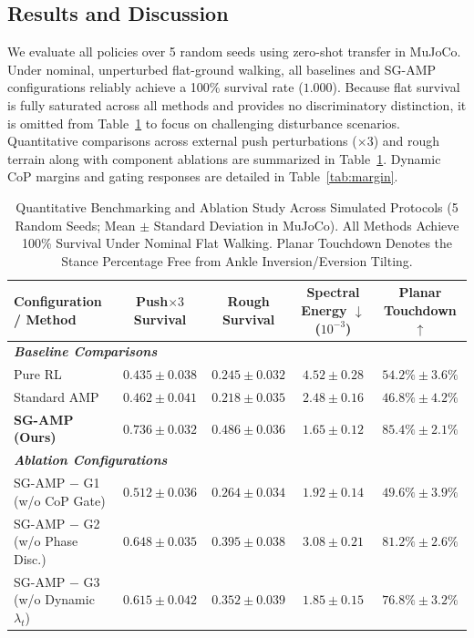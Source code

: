 \documentclass[conference]{IEEEtran}
\begin{document}
\subsection{Results and Discussion}
\label{subsec:results}

We evaluate all policies over 5 random seeds using zero-shot transfer in MuJoCo. Under nominal, unperturbed flat-ground walking, all baselines and SG-AMP configurations reliably achieve a 100\% survival rate ($1.000$). Because flat survival is fully saturated across all methods and provides no discriminatory distinction, it is omitted from Table~\ref{tab:comparison} to focus on challenging disturbance scenarios. Quantitative comparisons across external push perturbations ($\times 3$) and rough terrain along with component ablations are summarized in Table~\ref{tab:comparison}. Dynamic CoP margins and gating responses are detailed in Table~\ref{tab:margin}.

\begin{table}[t]
  \centering
  \caption{Quantitative Benchmarking and Ablation Study Across Simulated Protocols (5 Random Seeds; Mean $\pm$ Standard Deviation in MuJoCo). All Methods Achieve 100\% Survival Under Nominal Flat Walking. Planar Touchdown Denotes the Stance Percentage Free from Ankle Inversion/Eversion Tilting.}
  \label{tab:comparison}
  \small
  \begin{tabular}{lcccc}
    \toprule
    Configuration / Method & Push$\times3$ Survival & Rough Survival & Spectral Energy $\downarrow$ ($10^{-3}$) & Planar Touchdown $\uparrow$ \\
    \midrule
    \multicolumn{5}{l}{\textit{\textbf{Baseline Comparisons}}} \\
    Pure RL & $0.435 \pm 0.038$ & $0.245 \pm 0.032$ & $4.52 \pm 0.28$ & $54.2\% \pm 3.6\%$ \\
    Standard AMP & $0.462 \pm 0.041$ & $0.218 \pm 0.035$ & $2.48 \pm 0.16$ & $46.8\% \pm 4.2\%$ \\
    \textbf{SG-AMP (Ours)} & $\mathbf{0.736 \pm 0.032}$ & $\mathbf{0.486 \pm 0.036}$ & $\mathbf{1.65 \pm 0.12}$ & $\mathbf{85.4\% \pm 2.1\%}$ \\
    \midrule
    \multicolumn{5}{l}{\textit{\textbf{Ablation Configurations}}} \\
    SG-AMP $-$ G1 (w/o CoP Gate) & $0.512 \pm 0.036$ & $0.264 \pm 0.034$ & $1.92 \pm 0.14$ & $49.6\% \pm 3.9\%$ \\
    SG-AMP $-$ G2 (w/o Phase Disc.) & $0.648 \pm 0.035$ & $0.395 \pm 0.038$ & $3.08 \pm 0.21$ & $81.2\% \pm 2.6\%$ \\
    SG-AMP $-$ G3 (w/o Dynamic $\lambda_t$) & $0.615 \pm 0.042$ & $0.352 \pm 0.039$ & $1.85 \pm 0.15$ & $76.8\% \pm 3.2\%$ \\
    \bottomrule
  \end{tabular}
\end{table}
\end{document}
